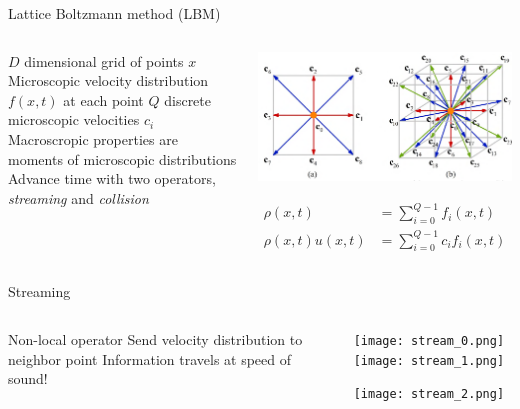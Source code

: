 \placelogofalse
\begin{frame}{Lattice Boltzmann method (LBM)}
\begin{columns}
\begin{outline}
\1 $D$ dimensional grid of points $x$
\1 Microscopic velocity distribution $f(x, t)$ at each point
\1 $Q$ discrete microscopic velocities $c_i$
\1 Macroscropic properties are moments of microscopic distributions
\1 Advance time with two operators, 
\textit{streaming} and \textit{collision}
\end{outline}

\centering
\begin{center}
  \includegraphics[width=0.9\linewidth]{lattice_figure.png}

  \begin{align*}
  \rho(x, t) &= \sum_{i = 0}^{Q - 1} f_i(x, t) \\
  \rho(x,t)u(x,t) &= \sum_{i = 0}^{Q - 1}c_i f_i(x, t)
  \end{align*}
\end{center}
\end{columns}
\end{frame}
\placelogotrue

\begin{frame}{Streaming}
\begin{columns}
\begin{outline}
\1 Non-local operator
\1 Send velocity distribution to neighbor point
\1 Information travels at speed of sound!
\end{outline}

\centering
  \begin{center}
    \texttt{[image: stream\_0.png]}
    \texttt{[image: stream\_1.png]}

    \texttt{[image: stream\_2.png]}
  \end{center}
\end{columns}
\end{frame}


